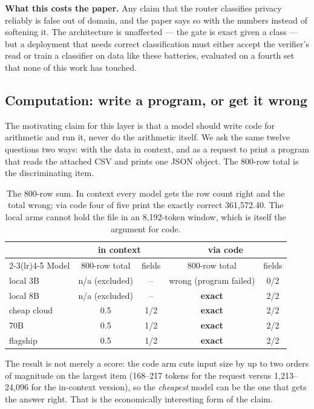 \documentclass[11pt]{article}
\begin{document}
\textbf{What this costs the paper.} Any claim that the router classifies privacy reliably is false
out of domain, and the paper says so with the numbers instead of softening it. The architecture is
unaffected --- the gate is exact given a class --- but a deployment that needs correct classification
must either accept the verifier's read or train a classifier on data like these batteries, evaluated
on a fourth set that none of this work has touched.

\subsection{Computation: write a program, or get it wrong}
\label{sec:code}

The motivating claim for this layer is that a model should write code for arithmetic and run it,
never do the arithmetic itself. We ask the same twelve questions two ways: with the data in
context, and as a request to print a program that reads the attached CSV and prints one JSON
object. The 800-row total is the discriminating item.

\begin{table}[h]
\centering
\small
\begin{tabular}{@{}lcccc@{}}
\toprule
& \multicolumn{2}{c}{\textbf{in context}} & \multicolumn{2}{c}{\textbf{via code}} \\
\cmidrule(lr){2-3}\cmidrule(lr){4-5}
Model & 800-row total & fields & 800-row total & fields \\
\midrule
local 3B           & n/a (excluded) & --   & wrong (program failed) & 0/2 \\
local 8B           & n/a (excluded) & --   & \textbf{exact} & 2/2 \\
cheap cloud        & 0.5 & 1/2 & \textbf{exact} & 2/2 \\
70B                & 0.5 & 1/2 & \textbf{exact} & 2/2 \\
flagship           & 0.5 & 1/2 & \textbf{exact} & 2/2 \\
\bottomrule
\end{tabular}
\caption{The 800-row sum. In context every model gets the row count right and the total wrong;
via code four of five print the exactly correct 361{,}572.40. The local arms cannot hold the
file in an 8{,}192-token window, which is itself the argument for code.}
\end{table}

The result is not merely a score: the code arm cuts input size by up to two orders of
magnitude on the largest item
(168--217 tokens for the request versus 1{,}213--24{,}096 for the in-context version),
so the \emph{cheapest} model can be the one that gets the answer right. That is the economically
interesting form of the claim.
\end{document}
